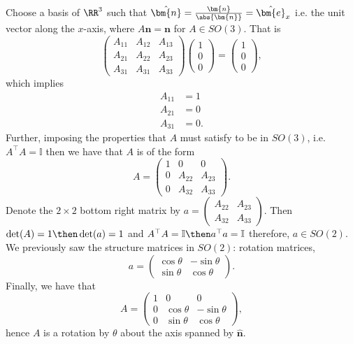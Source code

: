 \documentclass[12pt, a4paper]{article}
\begin{document}
Choose a basis of \(\RR^3\) such that \(\hat{\bm{n}} =\frac{\bm{n}}{\abs{\bm{n}}}=\hat{\bm{e}}_x\) i.e. the unit vector along the \(x\)-axis, where \(A\bm{n}=\bm{n}\) for \(A \in SO(3)\). That is 
\[\begin{pmatrix}
     A_{11} & A_{12} & A_{13} \\
    A_{21} & A_{22} & A_{23} \\
    A_{31} & A_{31} & A_{33} 
\end{pmatrix} 
\begin{pmatrix}
    1 \\ 0\\ 0
\end{pmatrix}
= 
\begin{pmatrix}
    1 \\ 0\\ 0
\end{pmatrix},\]
which implies 
\[\begin{aligned}
    A_{11} &=1 \\
    A_{21} &= 0 \\
    A_{31} &= 0.
\end{aligned}\]
Further, imposing the properties that \(A\) must satisfy to be in \(SO(3)\), i.e. \(A^{\top}A =\mathbb{I}\) then we have that \(A\) is of the form 
\[A = \begin{pmatrix}
    1 & 0 &0 \\
    0& A_{22} & A_{23} \\
    0 & A_{32} & A_{33} 
\end{pmatrix}.\]
Denote the \(2 \times 2\) bottom right matrix by \(a = \begin{pmatrix} A_{22} & A_{23} \\ A_{32} & A_{33}  \end{pmatrix}\).
Then \(\det(A)=1 \then \det(a)=1\) and \(A^{\top}A =\mathbb{I} \then a^{\top} a = \mathbb{I}\) therefore, \(a \in SO(2)\).
We previously saw the structure matrices in \(SO(2)\): rotation matrices,
\[a=\begin{pmatrix} 
    \cos\theta & -\sin\theta \\ 
    \sin\theta & \cos\theta  
\end{pmatrix}.\]
Finally, we have that 
\[A = \begin{pmatrix}
    1 & 0 & 0 \\
    0 & \cos\theta & -\sin\theta \\
    0 & \sin\theta & \cos\theta
\end{pmatrix},\]
hence \(A\) is a rotation by \(\theta\) about the axis spanned by \(\hat{\bm{n}}\).
\end{document}
